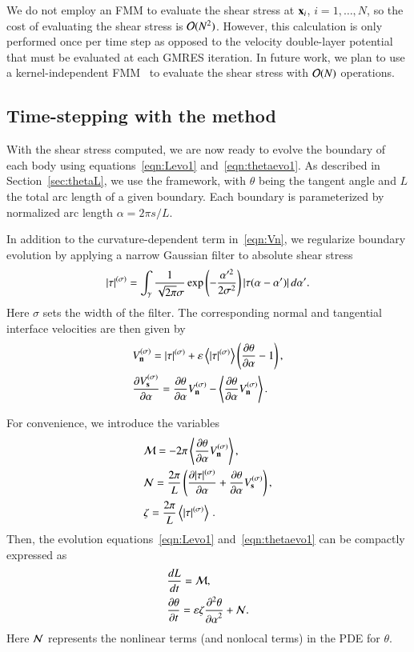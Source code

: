 \documentclass[preprint, 10pt]{elsarticle}
\begin{document}
We do not employ an FMM to evaluate the shear stress at ${\mathbf{x}}_i$,
$i=1,\ldots,N$, so the cost of evaluating the shear stress is
${\mathcal{O}}(N^2)$.  However, this calculation is only performed once per time
step as opposed to the velocity double-layer potential that must be
evaluated at each GMRES iteration.  In future work, we plan to use a
kernel-independent FMM~\cite{yin-bir-zor2004} to evaluate the shear
stress with ${\mathcal{O}}(N)$ operations.

\subsection{Time-stepping with the {\thL} method} 
\label{sec:timeStepping}

With the shear stress computed, we are now ready to evolve the boundary of each body using equations~\eqref{eqn:Levo1} and~\eqref{eqn:thetaevo1}.  As described in Section~\ref{sec:thetaL}, we use the {\thL} framework, with $\theta$ being the tangent angle and $L$ the total arc length of a given boundary. Each boundary is parameterized by normalized arc length $\alpha = 2 \pi s / L$.

In addition to the curvature-dependent term in~\eqref{eqn:Vn}, we regularize boundary evolution by applying a narrow Gaussian filter to absolute shear stress
\begin{align*}
\lvert \tau \rvert^{(\sigma)} = \int_{\gamma} \frac{1}{\sqrt{2\pi} \sigma} \exp \left(-
\frac{\alpha'^2}{2 \sigma^2}\right) \lvert  \tau(\alpha - \alpha')  \rvert \,
d\alpha'.
\end{align*}
Here $\sigma$ sets the width of the filter. The corresponding normal and tangential interface velocities are then given by
\begin{align*}
& V_{\mathbf{n}}^{(\sigma)} = \lvert \tau \rvert^{(\sigma)} +  \varepsilon \left< \lvert \tau \rvert^{(\sigma)} \right>
\left(\frac{\partial \theta}{\partial \alpha} - 1 \right), \\
& \frac{\partial V_{\mathbf{s}}^{(\sigma)}}{\partial \alpha} = \frac{\partial \theta}{\partial \alpha} V_{\mathbf{n}}^{(\sigma)} - \left< \frac{\partial \theta}{\partial \alpha} V_{\mathbf{n}}^{(\sigma)} \right>.
\end{align*}

For convenience, we introduce the variables
\begin{align*}
& \mathcal{M} = - 2 \pi \left< \frac{\partial \theta}{\partial \alpha} V_{\mathbf{n}}^{(\sigma)} \right>, \\
& \mathcal{N} = \frac{2 \pi}{L} \left( \frac{\partial \lvert \tau \rvert^{(\sigma)}}{\partial \alpha} + \frac{\partial \theta}{\partial \alpha}
V_{\mathbf{s}}^{(\sigma)} \right), \\
& \zeta = \frac{2 \pi}{L}  \left< \lvert \tau \rvert^{(\sigma)} \right> \, .
\end{align*}
Then, the evolution equations~\eqref{eqn:Levo1}
and~\eqref{eqn:thetaevo1} can be compactly expressed as
\begin{align}
\label{eqn:Levo2}
& \frac{d L}{d t} = \mathcal{M}, \\
\label{eqn:thetaevo2}
& \frac{\partial \theta}{\partial t} = \varepsilon \zeta \frac{\partial^2 \theta}{{\partial \alpha}^2} + \mathcal{N}.
\end{align}
Here $\mathcal{N}$ represents the nonlinear terms (and nonlocal terms) in the PDE for $\theta$.  
\end{document}
